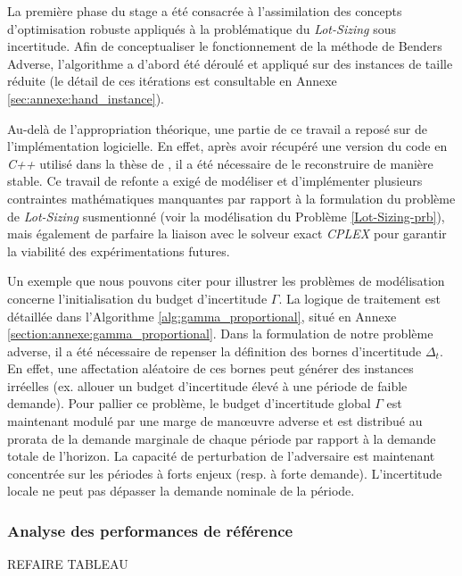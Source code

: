 \documentclass[12pt, a4paper, twoside]{article}
\numberwithin{equation}{section}
\begin{document}
	La première phase du stage a été consacrée à l'assimilation des concepts d'optimisation robuste appliqués à la problématique du \textit{Lot-Sizing} sous incertitude. Afin de conceptualiser le fonctionnement de la méthode de Benders Adverse, l'algorithme a d'abord été déroulé et appliqué sur des instances de taille réduite (le détail de ces itérations est consultable en Annexe \ref{sec:annexe:hand_instance}).
	
	Au-delà de l'appropriation théorique, une partie de ce travail a reposé sur de l'implémentation logicielle. En effet, après avoir récupéré une version du code en \textit{C++} utilisé dans la thèse de \cite{portoleauTHESIS}, il a été nécessaire de le reconstruire de manière stable. Ce travail de refonte a exigé de modéliser et d'implémenter plusieurs contraintes mathématiques manquantes par rapport à la formulation du problème de \textit{Lot-Sizing} susmentionné (voir la modélisation du Problème \ref{Lot-Sizing-prb}), mais également de parfaire la liaison avec le solveur exact \textit{CPLEX} pour garantir la viabilité des expérimentations futures.

    Un exemple que nous pouvons citer pour illustrer les problèmes de modélisation concerne l'initialisation du budget d'incertitude $\Gamma$. La logique de traitement est détaillée dans l'Algorithme \ref{alg:gamma_proportional}, situé en Annexe \ref{section:annexe:gamma_proportional}. Dans la formulation de notre problème adverse, il a été nécessaire de repenser la définition des bornes d'incertitude $\Delta_t$. En effet, une affectation aléatoire de ces bornes peut générer des instances irréelles (ex. allouer un budget d'incertitude élevé à une période de faible demande). Pour pallier ce problème, le budget d'incertitude global $\Gamma$ est maintenant modulé par une marge de manœuvre adverse et est distribué au prorata de la demande marginale de chaque période par rapport à la demande totale de l'horizon. La capacité de perturbation de l'adversaire est maintenant concentrée sur les périodes à forts enjeux (resp. à forte demande). L'incertitude locale ne peut pas dépasser la demande nominale de la période.
	
	\subsubsection{Analyse des performances de référence} REFAIRE TABLEAU
	
\end{document}
